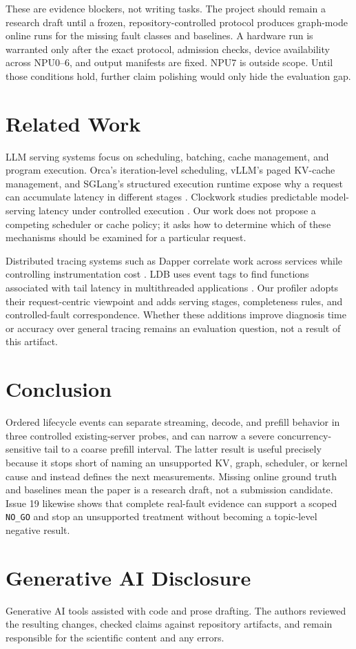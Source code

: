 \documentclass[sigconf,screen,nonacm]{acmart}
\begin{document}
These are evidence blockers, not writing tasks. The project should remain a
research draft until a frozen, repository-controlled protocol produces
graph-mode online runs for the missing fault classes and baselines. A hardware
run is warranted only after the exact protocol, admission checks, device
availability across NPU0--6, and output manifests are fixed. NPU7 is outside
scope. Until those conditions hold, further claim polishing would only hide the
evaluation gap.

\section{Related Work}

LLM serving systems focus on scheduling, batching, cache management, and
program execution. Orca's iteration-level scheduling, vLLM's paged KV-cache
management, and SGLang's structured execution runtime expose why a request can
accumulate latency in different stages \cite{orca2022,vllm2023,sglang2024}.
Clockwork studies predictable model-serving latency under controlled execution
\cite{clockwork2020}. Our work does not propose a competing scheduler or cache
policy; it asks how to determine which of these mechanisms should be examined
for a particular request.

Distributed tracing systems such as Dapper correlate work across services
while controlling instrumentation cost \cite{dapper2010}. LDB uses event tags
to find functions associated with tail latency in multithreaded applications
\cite{ldb2024}. Our profiler adopts their request-centric viewpoint and adds
serving stages, completeness rules, and controlled-fault correspondence.
Whether these additions improve diagnosis time or accuracy over general
tracing remains an evaluation question, not a result of this artifact.

\section{Conclusion}

Ordered lifecycle events can separate streaming, decode, and prefill behavior
in three controlled existing-server probes, and can narrow a severe
concurrency-sensitive tail to a coarse prefill interval. The latter result is
useful precisely because it stops short of naming an unsupported KV, graph,
scheduler, or kernel cause and instead defines the next measurements. Missing
online ground truth and baselines mean the paper is a research draft, not a
submission candidate.
Issue 19 likewise shows that complete real-fault evidence can support a scoped
\texttt{NO\_GO} and stop an unsupported treatment without becoming a
topic-level negative result.

\section*{Generative AI Disclosure}

Generative AI tools assisted with code and prose drafting. The authors reviewed
the resulting changes, checked claims against repository artifacts, and remain
responsible for the scientific content and any errors.



\end{document}
